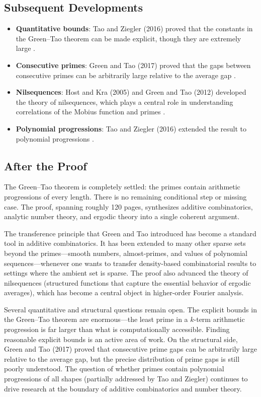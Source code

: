 \subsection{Subsequent Developments}

\begin{itemize}
\item \textbf{Quantitative bounds}: Tao and Ziegler (2016) proved that the constants in the Green--Tao theorem can be made explicit, though they are extremely large \cite{tao2016}.
\item \textbf{Consecutive primes}: Green and Tao (2017) proved that the gaps between consecutive primes can be arbitrarily large relative to the average gap \cite{greentao2017}.
\item \textbf{Nilsequences}: Host and Kra (2005) and Green and Tao (2012) developed the theory of nilsequences, which plays a central role in understanding correlations of the Mobius function and primes \cite{host2005, greentao2012}.
\item \textbf{Polynomial progressions}: Tao and Ziegler (2016) extended the result to polynomial progressions \cite{tao2016}.
\end{itemize}

\subsection{After the Proof}

The Green--Tao theorem is completely settled: the primes contain arithmetic progressions of every length. There is no remaining conditional step or missing case. The proof, spanning roughly 120 pages, synthesizes additive combinatorics, analytic number theory, and ergodic theory into a single coherent argument.

The transference principle that Green and Tao introduced has become a standard tool in additive combinatorics. It has been extended to many other sparse sets beyond the primes---smooth numbers, almost-primes, and values of polynomial sequences---whenever one wants to transfer density-based combinatorial results to settings where the ambient set is sparse. The proof also advanced the theory of nilsequences (structured functions that capture the essential behavior of ergodic averages), which has become a central object in higher-order Fourier analysis.

Several quantitative and structural questions remain open. The explicit bounds in the Green--Tao theorem are enormous---the least prime in a $k$-term arithmetic progression is far larger than what is computationally accessible. Finding reasonable explicit bounds is an active area of work. On the structural side, Green and Tao (2017) proved that consecutive prime gaps can be arbitrarily large relative to the average gap, but the precise distribution of prime gaps is still poorly understood. The question of whether primes contain polynomial progressions of all shapes (partially addressed by Tao and Ziegler) continues to drive research at the boundary of additive combinatorics and number theory.

